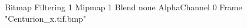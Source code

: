 {Bitmap
	{Filtering 1}
	{Mipmap 1}
	{Blend none}
	{AlphaChannel 0}
	{Frame "Centurion_x.tif.bmp"}
}
